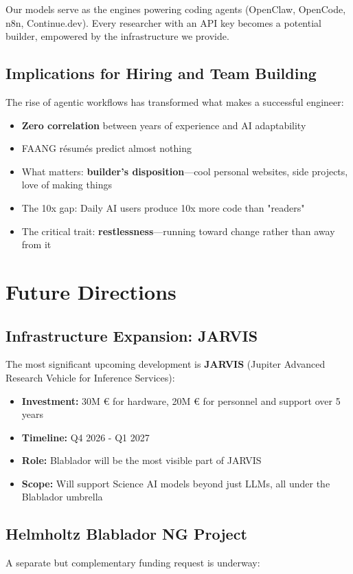 \documentclass[10pt,conference]{IEEEtran}
\begin{document}
Our models serve as the engines powering coding agents (OpenClaw, OpenCode, n8n, Continue.dev). Every researcher with an API key becomes a potential builder, empowered by the infrastructure we provide.

\subsection{Implications for Hiring and Team Building}
The rise of agentic workflows has transformed what makes a successful engineer:
\begin{itemize}
    \item \textbf{Zero correlation} between years of experience and AI adaptability
    \item FAANG résumés predict almost nothing
    \item What matters: \textbf{builder's disposition}—cool personal websites, side projects, love of making things
    \item The 10x gap: Daily AI users produce 10x more code than "readers"
    \item The critical trait: \textbf{restlessness}—running toward change rather than away from it
\end{itemize}

\section{Future Directions}
\subsection{Infrastructure Expansion: JARVIS}
The most significant upcoming development is \textbf{JARVIS} (Jupiter Advanced Research Vehicle for Inference Services):

\begin{itemize}
    \item \textbf{Investment:} 30M € for hardware, 20M € for personnel and support over 5 years
    \item \textbf{Timeline:} Q4 2026 - Q1 2027
    \item \textbf{Role:} Blablador will be the most visible part of JARVIS
    \item \textbf{Scope:} Will support Science AI models beyond just LLMs, all under the Blablador umbrella
\end{itemize}

\subsection{Helmholtz Blablador NG Project}
A separate but complementary funding request is underway:
\end{document}
